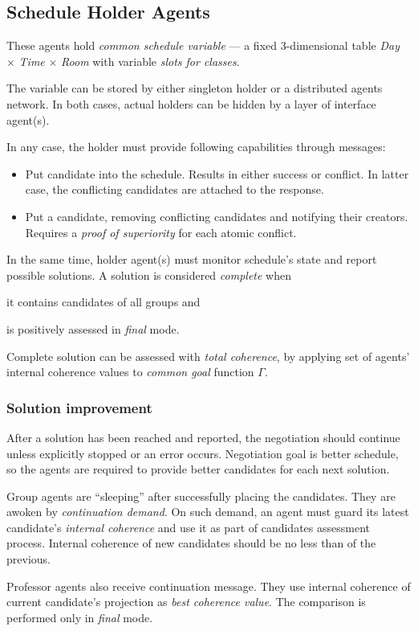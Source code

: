 \documentclass[../../ThesisDoc]{subfiles}
\begin{document}
\providecommand{\rootdir}{../..}


\subsection{Schedule Holder Agents}
\label{sec:solution-schedule-var}

These agents hold \emph{common schedule variable} --- a fixed 3-dimensional table
\emph{Day} $\times$ \emph{Time} $\times$ \emph{Room} with variable
\emph{slots for classes}.

The variable can be stored by either singleton holder or a distributed agents network.
In both cases, actual holders can be hidden by a layer of interface agent(s).

In any case, the holder must provide following capabilities through messages:
\begin{itemize}
  \item Put candidate into the schedule. Results in either success or conflict.
        In latter case, the conflicting candidates are attached to the response.
  \item Put a candidate, removing conflicting candidates and notifying their
        creators. Requires a \emph{proof of superiority} for each atomic conflict.
\end{itemize}

\medskip
\noindent
In the same time, holder agent(s) must monitor schedule's state and report
possible solutions. A solution is considered \emph{complete} when
\begin{enumerate*}
  \item it contains candidates of all groups and
  \item is positively assessed in \emph{final} mode.
\end{enumerate*}

Complete solution can be assessed with \emph{total coherence}, by applying
set of agents' internal coherence values to \emph{common goal} function $\Gamma$.

\subsubsection{Solution improvement}
\label{sec:solution-better}

After a solution has been reached and reported, the negotiation should continue
unless explicitly stopped or an error occurs. Negotiation goal is better
schedule, so the agents are required to provide better candidates for each next
solution.

Group agents are ``sleeping'' after successfully placing the candidates.
They are awoken by \emph{continuation demand}. On such demand, an agent
must guard its latest candidate's \emph{internal coherence} and use it as part
of candidates assessment process.
Internal coherence of new candidates should be no less than of the previous.

Professor agents also receive continuation message. They use internal coherence
of current candidate's projection as \emph{best coherence value}.
The comparison is performed only in \emph{final} mode.
\end{document}
